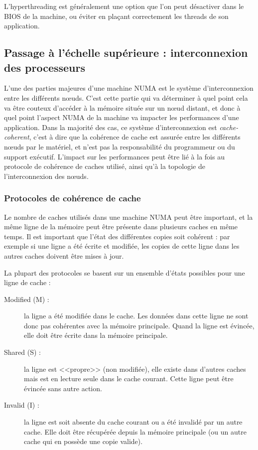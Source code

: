 L'hyperthreading est généralement une option que l'on peut désactiver dans le BIOS de la machine, ou éviter en plaçant correctement les threads de son application.


\subsection{Passage à l'échelle supérieure : interconnexion des processeurs}\label{sec:context:numa:interconnect}

L'une des parties majeures d'une machine NUMA est le système d'interconnexion entre les différents nœuds.
C'est cette partie qui va déterminer à quel point cela va être couteux d'accéder à la mémoire située sur un nœud distant, et donc à quel point l'aspect NUMA de la machine va impacter les performances d'une application.
Dans la majorité des cas, ce système d'interconnexion est \emph{cache-coherent}, c'est à dire que la cohérence de cache est assurée entre les différents nœuds par le matériel, et n'est pas la responsabilité du programmeur ou du support exécutif.
L'impact sur les performances peut être lié à la fois au protocole de cohérence de caches utilisé, ainsi qu'à la topologie de l'interconnexion des nœuds.


\subsubsection{Protocoles de cohérence de cache}

Le nombre de caches utilisés dans une machine NUMA peut être important, et la même ligne de la mémoire peut être présente dans plusieurs caches en même temps.
Il est important que l'état des différentes copies soit cohérent : par exemple si une ligne a été écrite et modifiée, les copies de cette ligne dans les autres caches doivent être mises à jour.

La plupart des protocoles se basent sur un ensemble d'états possibles pour une ligne de cache :

\begin{description}
  \item [Modified (M) :] la ligne a été modifiée dans le cache. Les données dans cette ligne ne sont donc pas cohérentes avec la mémoire principale. Quand la ligne est évincée, elle doit être écrite dans la mémoire principale.
  \item [Shared (S) :] la ligne est <<propre>> (non modifiée), elle existe dans d'autres caches mais est en lecture seule dans le cache courant. Cette ligne peut être évincée sans autre action.
  \item [Invalid (I) :] la ligne est soit absente du cache courant ou a été invalidé par un autre cache. Elle doit être récupérée depuis la mémoire principale (ou un autre cache qui en possède une copie valide).
\end{description}

